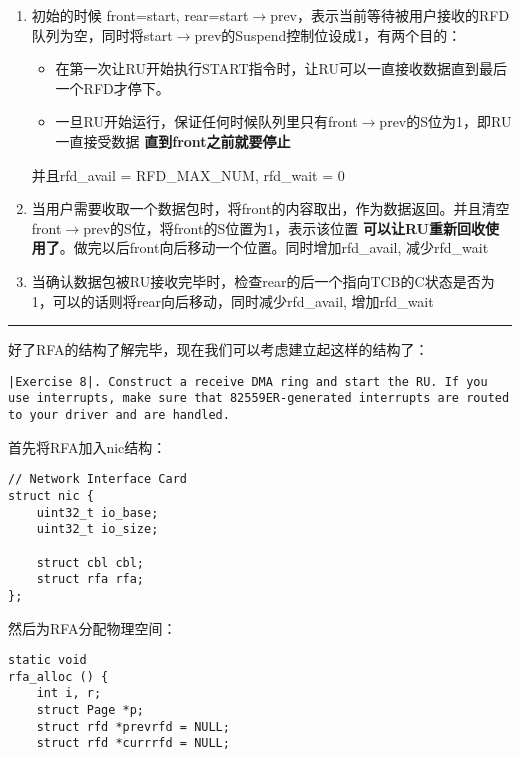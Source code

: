 \documentclass{article}
\newcommand{\highlight}[1]{{\bfseries \color{red}  #1}}
\begin{document}
\begin{CJK*}{UTF8}{gkai}
\begin{enumerate}
\item{初始的时候 front=start, rear=start$\rightarrow$prev，表示当前等待被用户接收的RFD队列为空，同时将start$\rightarrow$prev的Suspend控制位设成1，有两个目的：

\label{ruwork}

\begin{itemize}

\item{在第一次让RU开始执行START指令时，让RU可以一直接收数据直到最后一个RFD才停下。}
\item{一旦RU开始运行，保证任何时候队列里只有front$\rightarrow$prev的S位为1，即RU一直接受数据\highlight{直到front之前就要停止}}
\end{itemize}

并且rfd\_avail = RFD\_MAX\_NUM, rfd\_wait = 0}
\item{当用户需要收取一个数据包时，将front的内容取出，作为数据返回。并且清空front$\rightarrow$prev的S位，将front的S位置为1，表示该位置\highlight{可以让RU重新回收使用了}。做完以后front向后移动一个位置。同时增加rfd\_avail, 减少rfd\_wait}
\item{当确认数据包被RU接收完毕时，检查rear的后一个指向TCB的C状态是否为1，可以的话则将rear向后移动，同时减少rfd\_avail, 增加rfd\_wait}

\end{enumerate}


\vspace{1em}
\hrule
\vspace{1em}

好了RFA的结构了解完毕，现在我们可以考虑建立起这样的结构了：

\begin{lstlisting}[style=exercise]
|Exercise 8|. Construct a receive DMA ring and start the RU. If you use interrupts, make sure that 82559ER-generated interrupts are routed to your driver and are handled.
\end{lstlisting}

首先将RFA加入nic结构：

\begin{lstlisting}[style=ccode, title={\scriptsize \ttfamily \bfseries kern/e100.h}]
// Network Interface Card
struct nic {
    uint32_t io_base;
    uint32_t io_size;

    struct cbl cbl;
    struct rfa rfa;
};\end{lstlisting}

然后为RFA分配物理空间：


\begin{lstlisting}[style=ccode, title={\scriptsize \ttfamily \bfseries kern/e100.c: rfa\_alloc()}]
static void
rfa_alloc () {
    int i, r;
    struct Page *p;
    struct rfd *prevrfd = NULL;
    struct rfd *currrfd = NULL;


\end{lstlisting}
\end{CJK*}
\end{document}
